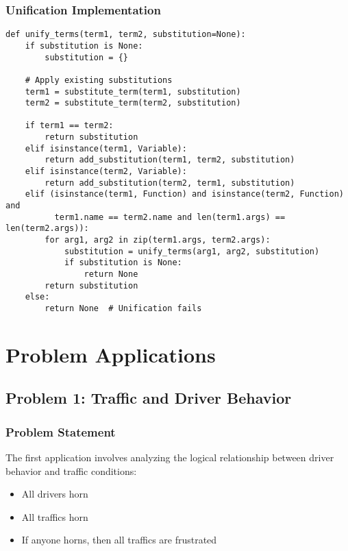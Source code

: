 \documentclass[11pt,a4paper]{article}
\begin{document}
\subsubsection{Unification Implementation}

\begin{lstlisting}[caption=Unification Algorithm]
def unify_terms(term1, term2, substitution=None):
    if substitution is None:
        substitution = {}
    
    # Apply existing substitutions
    term1 = substitute_term(term1, substitution)
    term2 = substitute_term(term2, substitution)
    
    if term1 == term2:
        return substitution
    elif isinstance(term1, Variable):
        return add_substitution(term1, term2, substitution)
    elif isinstance(term2, Variable):
        return add_substitution(term2, term1, substitution)
    elif (isinstance(term1, Function) and isinstance(term2, Function) and
          term1.name == term2.name and len(term1.args) == len(term2.args)):
        for arg1, arg2 in zip(term1.args, term2.args):
            substitution = unify_terms(arg1, arg2, substitution)
            if substitution is None:
                return None
        return substitution
    else:
        return None  # Unification fails
\end{lstlisting}

\section{Problem Applications}

\subsection{Problem 1: Traffic and Driver Behavior}

\subsubsection{Problem Statement}

The first application involves analyzing the logical relationship between driver behavior and traffic conditions:
\begin{itemize}
    \item All drivers horn
    \item All traffics horn
    \item If anyone horns, then all traffics are frustrated
\end{itemize}
\end{document}
